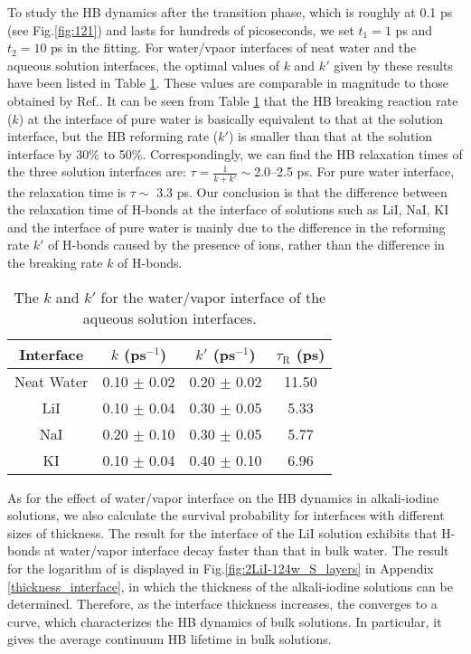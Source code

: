 To study the HB dynamics after the transition phase, which is roughly at 0.1 ps (see Fig.\thinspace\ref{fig:121}) and lasts for hundreds of picoseconds, 
we set $t_1 = 1$ ps and $t_2 = 10$ ps in the fitting.
For water/vpaor interfaces of neat water and the aqueous solution interfaces, 
the optimal values of $k$ and $k'$ given by these results have been listed in Table \ref{tab:k_k_prime_pure_and_solutions}. 
These values are comparable in magnitude to those obtained by Ref.. 
It can be seen from Table \ref{tab:k_k_prime_pure_and_solutions} that the HB breaking reaction rate ($k$) at the interface of pure water is basically equivalent to 
that at the solution interface, but the HB reforming rate ($k'$) is smaller than that at the solution interface by 30\% to 50\%.
Correspondingly, we can find the HB relaxation times of the three solution interfaces are: $\tau=\frac{1}{k+k'} \sim $2.0--2.5 ps. 
For pure water interface, the relaxation time is $\tau \sim $ 3.3 ps. 
Our conclusion is that the difference between the relaxation time of H-bonds at the interface of solutions such as LiI, NaI, KI 
and the interface of pure water is mainly due to the difference in the reforming rate $k'$ of H-bonds caused by the presence of ions,
rather than the difference in the breaking rate $k$ of H-bonds.
%
\begin{table}[htbp]
\centering
\caption{\label{tab:k_k_prime_pure_and_solutions} 
    The $k$ and $k'$ for the water/vapor interface of the aqueous solution interfaces.} 
\begin{tabular}{cccc}
 Interface & $k$ (ps$^{-1}$) & $k'$ (ps$^{-1}$) & $\tau_{\text{R}}$ (ps) \\
\hline
  Neat Water & 0.10 $\pm$ 0.02 & 0.20 $\pm$ 0.02 & 11.50 \\
  LiI & 0.10 $\pm$ 0.04 & 0.30 $\pm$ 0.05 & 5.33 \\
  NaI & 0.20 $\pm$ 0.10 & 0.30 $\pm$ 0.05 & 5.77 \\
  KI  & 0.10 $\pm$ 0.04 & 0.40 $\pm$ 0.10 & 6.96 
\end{tabular}
\end{table}

As for the effect of water/vapor interface on the HB dynamics in alkali-iodine solutions,
we also calculate the survival probability for interfaces with different sizes of thickness. 
The result for the interface of the LiI solution exhibits that H-bonds at water/vapor interface decay faster than that in bulk water.
The result for the logarithm of \SHB is displayed in Fig.\space\ref{fig:2LiI-124w_S_layers} in Appendix \ref{thickness_interface}, 
in which the thickness of the alkali-iodine solutions can be determined.
Therefore, as the interface thickness increases, the \SHB converges to a curve, 
which characterizes the HB dynamics of bulk solutions. 
In particular, it gives the average continuum HB lifetime in bulk solutions.
\FloatBarrier
